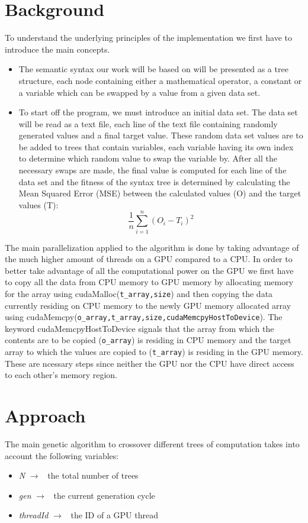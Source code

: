 \documentclass[runningheads]{llncs}
\begin{document}
\section{Background}
To understand the underlying principles of the implementation we first have to introduce the main concepts.
\begin{itemize}
	\item The semantic syntax our work will be based on will be presented as a tree structure, each node containing either a mathematical operator, a constant or a variable which can be swapped by a value from a given data set.
	\item To start off the program, we must introduce an initial data set. The data set will be read as a text file, each line of the text file containing randomly generated values and a final target value. These random data set values are to be added to trees that contain variables, each variable having its own index to determine which random value to swap the variable by. After all the necessary swaps are made, the final value is computed for each line of the data set and the fitness of the syntax tree is determined by calculating the Mean Squared Error (MSE) between the calculated values (O) and the target values (T): $$\frac{1}{n}\sum_{i=1}^{n} (O_i - T_i)^{2}$$
\end{itemize}

The main parallelization applied to the algorithm is done by taking advantage of the much higher amount of threads on a GPU compared to a CPU. In order to better take advantage of all the computational power on the GPU we first have to copy all the data from CPU memory to GPU memory by allocating memory for the array using cudaMalloc(\texttt{t\_array,size}) and then copying the data currently residing on CPU memory to the newly GPU memory allocated array using cudaMemcpy(\texttt{o\_array,t\_array,size,cudaMemcpyHostToDevice}). The keyword cudaMemcpyHostToDevice signals that the array from which the contents are to be copied (\texttt{o\_array}) is residing in CPU memory and the target array to which the values are copied to (\texttt{t\_array}) is residing in the GPU memory. These are ncessary steps since neither the GPU nor the CPU have direct access to each other's memory region.

\section{Approach}
The main genetic algorithm to crossover different trees of computation takes into account the following variables:
\begin{itemize}
	\item \textit{N} $\rightarrow$ \ the total number of trees
	\item \textit{gen} $\rightarrow$ \ the current generation cycle
	\item \textit{threadId} $\rightarrow$ \ the ID of a GPU thread
\end{itemize}
\end{document}
